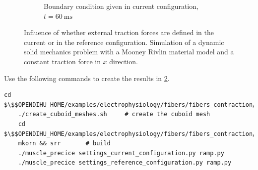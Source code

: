 \begin{figure}
\begin{subfigure}[t]{0.31\textwidth}
    \caption{Boundary condition given in current configuration, $t=\SI{60}{\milli\second}$}%
    \label{fig:current_configuration_3}%
  \end{subfigure}
  \caption{Influence of whether external traction forces are defined in the current or in the reference configuration. Simulation of a dynamic solid mechanics problem with a Mooney Rivlin material model and a constant traction force in $x$ direction.}%
  \label{fig:traction_current_reference_configuration}%
\end{figure}%

\begin{reproduce}
  Use the following commands to create the results in \cref{fig:traction_current_reference_configuration}.
  \begin{lstlisting}[columns=fullflexible,breaklines=true,postbreak=\mbox{\textcolor{gray}{$\hookrightarrow$}\space}]
    cd $\$$OPENDIHU_HOME/examples/electrophysiology/fibers/fibers_contraction/with_tendons_precice/meshes
    ./create_cuboid_meshes.sh     # create the cuboid mesh
    cd $\$$OPENDIHU_HOME/examples/electrophysiology/fibers/fibers_contraction/with_tendons_precice/traction_current_or_reference_configuration
    mkorn && srr       # build
    ./muscle_precice settings_current_configuration.py ramp.py
    ./muscle_precice settings_reference_configuration.py ramp.py
  \end{lstlisting}
\end{reproduce}



